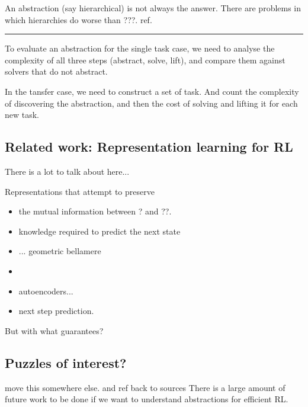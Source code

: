 An abstraction (say hierarchical) is not always the answer. There are problems in which
hierarchies do worse than ???. ref.

\begin{center}\rule{0.5\linewidth}{\linethickness}\end{center}

To evaluate an abstraction for the single task case, we need to analyse the
complexity of all three steps (abstract, solve, lift), and compare them against
solvers that do not abstract.

In the tansfer case, we need to construct a set of task. And count the
complexity of discovering the abstraction, and then the cost of solving
and lifting it for each new task.

\subsection{Related work: Representation learning for RL}


{\color{red}There is a lot to talk about here...}

Representations that attempt to preserve
\begin{itemize}
\tightlist
  \item the mutual information between ? and ??.
  \item knowledge required to predict the next state
  \item ... geometric bellamere
  \item \cite{Nachum2018}
  \item autoencoders...
  \item next step prediction.
\end{itemize}

But with what guarantees?

\subsection{Puzzles of interest?}

{\color{red}move this somewhere else. and ref back to sources}
There is a large amount of future work to be done if we want to understand abstractions for efficient RL.

